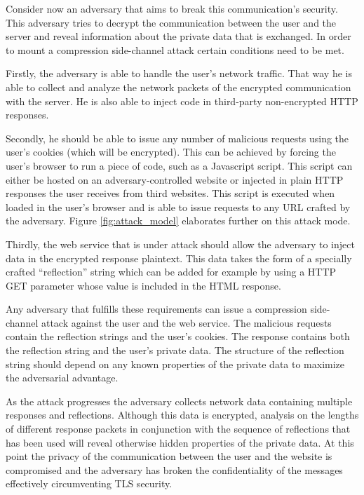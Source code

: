 \documentclass[conference, letterpaper, 10pt]{IEEEtran}
\begin{document}
Consider now an adversary that aims to break this communication's security.
This adversary tries to decrypt the communication between
the user and the server and reveal information about the private data that is
exchanged. In order to mount a compression side-channel attack certain
conditions need to be met.

Firstly, the adversary is able to handle the user's network traffic. That way he
is able to collect and analyze the network packets of the encrypted
communication with the server. He is also able to inject code in third-party
non-encrypted HTTP responses.

Secondly, he should be able to issue any number of malicious requests using the
user's cookies (which will be encrypted). This can be achieved by forcing the user's browser to run a
piece of code, such as a Javascript script. This script can either be hosted on
an adversary-controlled website or injected in plain HTTP responses the user
receives from third websites. This script is executed when loaded in the user's
browser and is able to issue requests to any URL crafted by the adversary.
Figure \ref{fig:attack_model} elaborates further on this attack mode.

Thirdly, the web service that is under attack should allow the adversary to
inject data in the encrypted response plaintext. This data takes the form of a
specially crafted ``reflection'' string which can be added for example by using a
HTTP GET parameter whose value is included in the HTML response.

Any adversary that fulfills these requirements can issue a compression
side-channel attack against the user and the web service. The malicious requests
contain the reflection strings and the user's cookies. The response contains
both the reflection string and the user's private data. The structure of the
reflection string should depend on any known properties of the private data
to maximize the adversarial advantage. 

As the attack progresses the adversary collects network data containing multiple
responses and reflections. Although this data is encrypted, analysis on the
lengths of different response packets in conjunction with the sequence
of reflections that has been used will reveal otherwise hidden properties of the private data.
At this point the privacy of the communication between the user and the website is
compromised and the adversary has broken the confidentiality of the messages
effectively circumventing TLS security.
\end{document}
